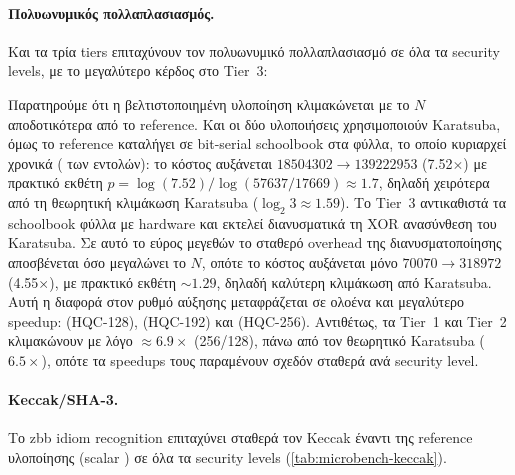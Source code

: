 \paragraph{Πολυωνυμικός πολλαπλασιασμός.}
Και τα τρία tiers επιταχύνουν τον πολυωνυμικό πολλαπλασιασμό σε όλα τα security
levels, με το μεγαλύτερο κέρδος στο Tier~3:

\begin{table}[htbp]
  \centering
  \caption{Isolated polymul \instret ανά tier και ανά security level (Spike, VLEN $= \num{256}$).}
  \label{tab:microbench-polymul}
  
\end{table}

Παρατηρούμε ότι η βελτιστοποιημένη υλοποίηση κλιμακώνεται με το $N$
αποδοτικότερα από το reference. Και οι δύο υλοποιήσεις χρησιμοποιούν
Karatsuba, όμως το reference καταλήγει σε bit-serial schoolbook στα φύλλα, 
το οποίο κυριαρχεί χρονικά ( των
εντολών): το κόστος αυξάνεται $\num{18504302} \to \num{139222953}$
(\num{7.52}$\times$) με πρακτικό εκθέτη $p = \log(\num{7.52}) / \log(\num{57637}/\num{17669}) \approx 1.7$, δηλαδή χειρότερα από τη
θεωρητική κλιμάκωση Karatsuba ($\log_2 3 \approx 1.59$). Το Tier~3
αντικαθιστά τα schoolbook φύλλα με hardware  και εκτελεί διανυσματικά τη XOR ανασύνθεση
του Karatsuba. Σε αυτό το εύρος μεγεθών το σταθερό overhead της διανυσματοποίησης 
αποσβένεται όσο μεγαλώνει το $N$, οπότε το κόστος αυξάνεται μόνο
$\num{70070} \to \num{318972}$ (\num{4.55}$\times$), με πρακτικό εκθέτη
$\sim 1.29$, δηλαδή καλύτερη κλιμάκωση από Karatsuba. Αυτή η διαφορά στον
ρυθμό αύξησης μεταφράζεται σε ολοένα και μεγαλύτερο speedup: 
(HQC-128),  (HQC-192) και  (HQC-256).
Αντιθέτως, τα Tier~1 και Tier~2 κλιμακώνουν με λόγο $\approx 6.9\times$
(256/128), πάνω από τον θεωρητικό Karatsuba ($6.5\times$), οπότε τα
speedups τους παραμένουν σχεδόν σταθερά ανά security level.

\paragraph{Keccak/SHA-3.}
Το \gls{zbb} idiom recognition επιταχύνει σταθερά τον Keccak έναντι της reference
υλοποίησης (scalar ) σε όλα τα security levels
(\cref{tab:microbench-keccak}).

\begin{table}[htbp]
  \centering
  \caption{Keccak microbenchmark \instret: reference vs optimized (Spike, VLEN $= \num{256}$).}
  \label{tab:microbench-keccak}
  
\end{table}

